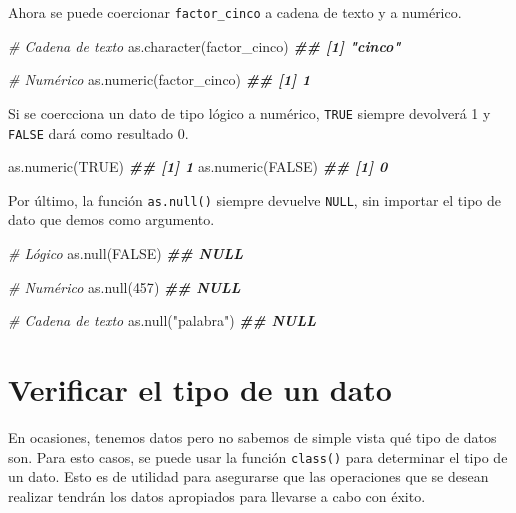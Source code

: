 \documentclass[
]{book}
\newenvironment{Shaded}{\begin{snugshade}}{\end{snugshade}}
\newcommand{\CommentTok}[1]{\textcolor[rgb]{0.56,0.35,0.01}{\textit{#1}}}
\newcommand{\ConstantTok}[1]{\textcolor[rgb]{0.00,0.00,0.00}{#1}}
\newcommand{\DecValTok}[1]{\textcolor[rgb]{0.00,0.00,0.81}{#1}}
\newcommand{\DocumentationTok}[1]{\textcolor[rgb]{0.56,0.35,0.01}{\textbf{\textit{#1}}}}
\newcommand{\FunctionTok}[1]{\textcolor[rgb]{0.00,0.00,0.00}{#1}}
\newcommand{\NormalTok}[1]{#1}
\newcommand{\StringTok}[1]{\textcolor[rgb]{0.31,0.60,0.02}{#1}}
\begin{document}
Ahora se puede coercionar \texttt{factor\_cinco} a cadena de texto y a numérico.

\begin{Shaded}
\begin{Highlighting}[]
\CommentTok{\# Cadena de texto}
\FunctionTok{as.character}\NormalTok{(factor\_cinco)}
\DocumentationTok{\#\# [1] "cinco"}

\CommentTok{\# Numérico}
\FunctionTok{as.numeric}\NormalTok{(factor\_cinco)}
\DocumentationTok{\#\# [1] 1}
\end{Highlighting}
\end{Shaded}

Si se coercciona un dato de tipo lógico a numérico, \texttt{TRUE} siempre devolverá 1 y \texttt{FALSE} dará como resultado 0.

\begin{Shaded}
\begin{Highlighting}[]
\FunctionTok{as.numeric}\NormalTok{(}\ConstantTok{TRUE}\NormalTok{)}
\DocumentationTok{\#\# [1] 1}
\FunctionTok{as.numeric}\NormalTok{(}\ConstantTok{FALSE}\NormalTok{)}
\DocumentationTok{\#\# [1] 0}
\end{Highlighting}
\end{Shaded}

Por último, la función \texttt{as.null()} siempre devuelve \texttt{NULL}, sin importar el tipo de dato que demos como argumento.

\begin{Shaded}
\begin{Highlighting}[]
\CommentTok{\# Lógico}
\FunctionTok{as.null}\NormalTok{(}\ConstantTok{FALSE}\NormalTok{)}
\DocumentationTok{\#\# NULL}

\CommentTok{\# Numérico}
\FunctionTok{as.null}\NormalTok{(}\DecValTok{457}\NormalTok{)}
\DocumentationTok{\#\# NULL}

\CommentTok{\# Cadena de texto}
\FunctionTok{as.null}\NormalTok{(}\StringTok{"palabra"}\NormalTok{)}
\DocumentationTok{\#\# NULL}
\end{Highlighting}
\end{Shaded}

\hypertarget{verificar-el-tipo-de-un-dato}{%
\section{Verificar el tipo de un dato}\label{verificar-el-tipo-de-un-dato}}

En ocasiones, tenemos datos pero no sabemos de simple vista qué tipo de datos son. Para esto casos, se puede usar la función \texttt{class()} para determinar el tipo de un dato. Esto es de utilidad para asegurarse que las operaciones que se desean realizar tendrán los datos apropiados para llevarse a cabo con éxito.
\end{document}

